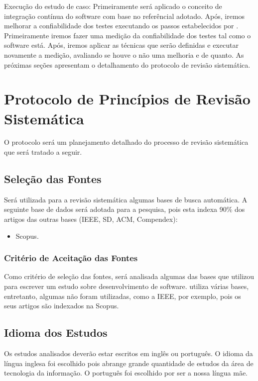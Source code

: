 Execução do estudo de caso: Primeiramente será aplicado o conceito de integração
contínua do software com base no referêncial adotado. Após, iremos melhorar a
confiabilidade dos testes executando os passos estabelecidos por \cite{e07}.
Primeiramente iremos fazer uma medição da confiabilidade dos testes tal como o
software está. Após, iremos aplicar as técnicas que serão definidas e executar
novamente a medição, avaliando se houve o não uma melhoria e de quanto.
As próximas seções apresentam o detalhamento do protocolo de revisão
sistemática.

\section{Protocolo de Princípios de Revisão Sistemática}
O protocolo será um planejamento detalhado do processo de revisão
sistemática que será tratado a seguir.
\subsection{Seleção das Fontes}
\label{sub:Seleção das Fontes}
Será utilizada para a revisão sistemática algumas bases de busca
automática. A seguinte base de dados será adotada para a pesquisa, pois
esta indexa 90\% dos artigos das outras bases (IEEE, SD, ACM, Compendex):

\begin{itemize}
    \item Scopus.
\end{itemize}

\subsubsection{Critério de Aceitação das Fontes}
\label{sub:Critério de Aceitação das Fontes}
Como critério de seleção das fontes, será analisada algumas das bases
que \cite{dyba} utilizou para escrever um estudo sobre desenvolvimento de
software. \cite{dyba} utiliza várias bases, entretanto, algumas não foram
utilizadas,
como a IEEE, por exemplo, pois os seus artigos são indexados na Scopus.

\subsection{Idioma dos Estudos}
\label{sub:Idioma dos Estudos}
Os estudos analisados deverão estar escritos em inglês ou português. O idioma da
língua inglesa foi escolhido pois abrange grande quantidade de estudos da área
de tecnologia da informação. O português foi escolhido por ser a nossa língua
mãe.

